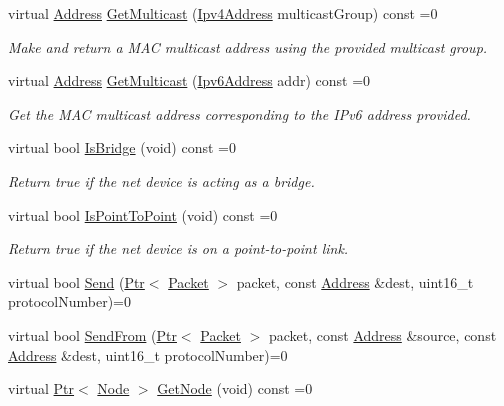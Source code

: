 \begin{DoxyCompactItemize}
\item 
virtual \hyperlink{classns3_1_1Address}{Address} \hyperlink{classns3_1_1NetDevice_a98aa4852df367b6a393c8cc1d88af0d9}{Get\+Multicast} (\hyperlink{classns3_1_1Ipv4Address}{Ipv4\+Address} multicast\+Group) const =0
\begin{DoxyCompactList}\small\item\em Make and return a M\+AC multicast address using the provided multicast group. \end{DoxyCompactList}\item 
virtual \hyperlink{classns3_1_1Address}{Address} \hyperlink{classns3_1_1NetDevice_a46479a2c0101c6f9da9251ed4d7575bd}{Get\+Multicast} (\hyperlink{classns3_1_1Ipv6Address}{Ipv6\+Address} addr) const =0
\begin{DoxyCompactList}\small\item\em Get the M\+AC multicast address corresponding to the I\+Pv6 address provided. \end{DoxyCompactList}\item 
virtual bool \hyperlink{classns3_1_1NetDevice_a9d34556a1c83a69dacb08698ca4a1d94}{Is\+Bridge} (void) const =0
\begin{DoxyCompactList}\small\item\em Return true if the net device is acting as a bridge. \end{DoxyCompactList}\item 
virtual bool \hyperlink{classns3_1_1NetDevice_a718177f25efeaf2dbf8a18fcab87224d}{Is\+Point\+To\+Point} (void) const =0
\begin{DoxyCompactList}\small\item\em Return true if the net device is on a point-\/to-\/point link. \end{DoxyCompactList}\item 
virtual bool \hyperlink{classns3_1_1NetDevice_a59f41afb0fe8951bb94d5739cbe6ee7d}{Send} (\hyperlink{classns3_1_1Ptr}{Ptr}$<$ \hyperlink{classns3_1_1Packet}{Packet} $>$ packet, const \hyperlink{classns3_1_1Address}{Address} \&dest, uint16\+\_\+t protocol\+Number)=0
\item 
virtual bool \hyperlink{classns3_1_1NetDevice_a19d55a4746c1ae584bf7da69959a885b}{Send\+From} (\hyperlink{classns3_1_1Ptr}{Ptr}$<$ \hyperlink{classns3_1_1Packet}{Packet} $>$ packet, const \hyperlink{classns3_1_1Address}{Address} \&source, const \hyperlink{classns3_1_1Address}{Address} \&dest, uint16\+\_\+t protocol\+Number)=0
\item 
virtual \hyperlink{classns3_1_1Ptr}{Ptr}$<$ \hyperlink{classns3_1_1Node}{Node} $>$ \hyperlink{classns3_1_1NetDevice_a098b6cc4339ac00c62e75cfa48c8aeac}{Get\+Node} (void) const =0

\end{DoxyCompactItemize}
